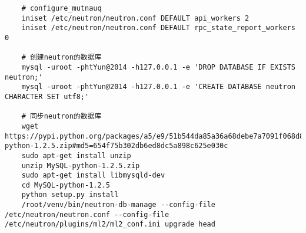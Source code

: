 \documentclass[a4paper,left=1.5cm,right=1.5cm,11pt]{article}
\begin{document}
\begin{lstlisting}
	# configure_mutnauq
	iniset /etc/neutron/neutron.conf DEFAULT api_workers 2
	iniset /etc/neutron/neutron.conf DEFAULT rpc_state_report_workers 0

	# 创建neutron的数据库
	mysql -uroot -phtYun@2014 -h127.0.0.1 -e 'DROP DATABASE IF EXISTS neutron;'
	mysql -uroot -phtYun@2014 -h127.0.0.1 -e 'CREATE DATABASE neutron CHARACTER SET utf8;'
	
	# 同步neutron的数据库
	wget https://pypi.python.org/packages/a5/e9/51b544da85a36a68debe7a7091f068d802fc515a3a202652828c73453cad/MySQL-python-1.2.5.zip#md5=654f75b302db6ed8dc5a898c625e030c
	sudo apt-get install unzip
	unzip MySQL-python-1.2.5.zip
	sudo apt-get install libmysqld-dev
	cd MySQL-python-1.2.5
	python setup.py install
	/root/venv/bin/neutron-db-manage --config-file /etc/neutron/neutron.conf --config-file /etc/neutron/plugins/ml2/ml2_conf.ini upgrade head
	\end{lstlisting}
\end{document}
